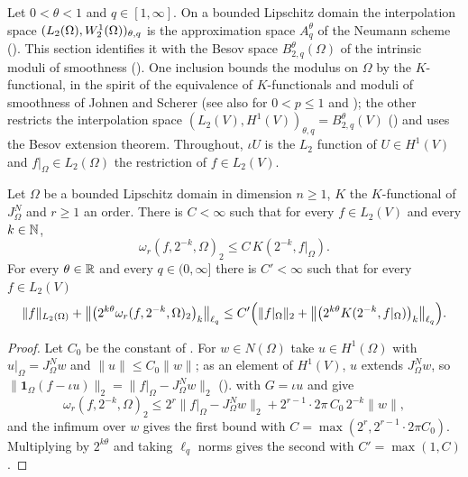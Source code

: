Let $0 < \theta < 1$ and $q \in [1, \infty]$. On a bounded Lipschitz domain the interpolation
space $(L_2(\Omega), W^{1}_{2}(\Omega))_{\theta, q}$ is the approximation space $A^\theta_q$ of
the Neumann scheme (). This section identifies it with the Besov
space $B^\theta_{2,q}(\Omega)$ of the intrinsic moduli of smoothness (). One
inclusion bounds the modulus on $\Omega$ by the $K$-functional, in the spirit of the
equivalence of $K$-functionals and moduli of smoothness of Johnen and Scherer
\cite{JohnenScherer1977} (see also \cite[(6.12) and Theorem~6.3]{DeVoreSharpley} for
$0 < p \leq 1$ and \cite[Theorem~6.7.3]{BerghLofstrom}); the other restricts the interpolation space
$(L_2(V), H^1(V))_{\theta, q} = B^\theta_{2,q}(V)$ ()
and uses the Besov extension theorem. Throughout, $\iota U$ is the $L_2$ function of
$U \in H^1(V)$ and $f|_\Omega \in L_2(\Omega)$ the restriction of $f \in L_2(V)$.

\begin{lemma}
\label{lem:modulus-on-k-functional}
\leanok
{}
Let $\Omega$ be a bounded Lipschitz domain in dimension $n \geq 1$, $K$ the $K$-functional of
$J^N_\Omega$ and $r \geq 1$ an order. There is $C < \infty$ such that for every $f \in L_2(V)$ and
every $k \in \mathbb{N}$,
\[
  \omega_r(f, 2^{-k}, \Omega)_2 \leq C \, K(2^{-k}, f|_\Omega).
\]
For every $\theta \in \mathbb{R}$ and every $q \in (0, \infty]$ there is $C' < \infty$ such that for every
$f \in L_2(V)$
\[
  \|f\|_{L_2(\Omega)} + \bigl\| \bigl(2^{k\theta} \omega_r(f, 2^{-k}, \Omega)_2\bigr)_k
    \bigr\|_{\ell_q}
  \leq C' \Bigl( \|f|_\Omega\|_2 + \bigl\| \bigl(2^{k\theta} K(2^{-k}, f|_\Omega)\bigr)_k
    \bigr\|_{\ell_q} \Bigr).
\]
\end{lemma}

\begin{proof}
\leanok
Let $C_0$ be the constant of . For $w \in N(\Omega)$ take
$u \in H^1(\Omega)$ with $u|_\Omega = J^N_\Omega w$ and $\|u\| \leq C_0 \|w\|$; as an element of
$H^1(V)$, $u$ extends $J^N_\Omega w$, so
$\|\mathbf 1_\Omega (f - \iota u)\|_2 = \|f|_\Omega - J^N_\Omega w\|_2$ ().
 with $G = \iota u$ and  give
\[
  \omega_r(f, 2^{-k}, \Omega)_2 \leq 2^r \|f|_\Omega - J^N_\Omega w\|_2
    + 2^{r-1} \cdot 2\pi \, C_0 \, 2^{-k} \|w\| ,
\]
and the infimum over $w$ gives the first bound with $C = \max(2^r, 2^{r-1} \cdot 2\pi C_0)$.
Multiplying by $2^{k\theta}$ and taking $\ell_q$ norms gives the second with $C' = \max(1, C)$.
\end{proof}

